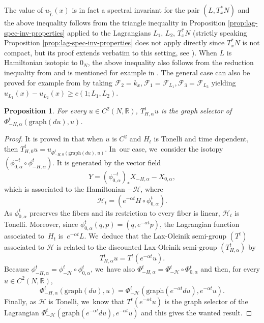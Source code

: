 \documentclass[JEP,XML,SOM,Unicode,NoFloatCountersInSection,published]{cedram}
\newtheorem{prop}[thm]{Proposition}
\theoremstyle{definition}
\newcommand{\Hh}{{\mathcal H}}
\newcommand{\R}{\mathbb{R}}
\begin{document}
The value of $u_{\tilde{L}}(x)$ is in fact a spectral invariant for the pair $(L,T_x^*N)$ and the above inequality follows from the triangle inequality in Proposition \ref{prop:lag-spec-inv-properties} applied to the Lagrangians $L_1$, $L_2$, $T_x^*N$ (strictly speaking Proposition \ref{prop:lag-spec-inv-properties} does not apply directly since $T_x^*N$ is not compact, but its proof extends verbatim to this setting, see \cite[Th.\,16]{Hum-Lec-Sey3}).
When $L$ is Hamiltonian isotopic to $0_N$, the above inequality also follows from the reduction inequality from \cite{Viterbo-STAGGF} and is mentioned for example in \cite[p.\,263]{Cardin-Viterbo}. The general case can also be proved for example from \cite[Prop.\,8.13]{Vichery-these} by taking
$\mathcal F_2=k_x, {\mathcal F}_1=\mathcal F_{L_1}, {\mathcal F}_3={\mathcal F}_{L_3}$ yielding $u_{L_1}(x)-u_{L_2}(x)\geq c(1;L_1,L_2)$.

\begin{prop}
For every $u\in C^2(N, \R)$, $T_{H, \alpha}^tu$ is the graph selector of $\Phi_{-H, \alpha}^t(\text{graph}(du), u)$.
\end{prop}
\begin{proof}
It is proved in \cite{Roos2019} that when $u$ is $C^2$ and $H_t$ is Tonelli and time dependent, then $T^t_{H, 0}u\!=\!u_{\Phi^t_{-H, 0}(\text{graph}(du), u)}$. In~our case, we~consider the isotopy~\hbox{$(\phi^{-t}_{0, \alpha}\circ \phi_{-H, \alpha}^{t})$}. It is generated by the vector field\vspace*{-3pt}
\[
Y=(\phi_{0,\alpha}^{-t})_* X_{-H,\alpha}-X_{0,\alpha},
\]
which is associated to the Hamiltonian $-\Hh$, where\vspace*{-3pt}
\[
\Hh_t=(e^{-\alpha t}H\circ \phi_{0, \alpha}^{t}).
\]
As $\phi_{0, \alpha}^{t}$ preserves the fibers and its restriction to every fiber is linear, $\Hh_t$ is Tonelli. Moreover, since $\phi_{0,\alpha}^t(q,p)=(q,e^{-\alpha t}p)$, the Lagrangian function associated to~$H_t$ is~$e^{-\alpha t}L$. We~deduce that the Lax-Oleinik semi-group $(T^t)$ associated to $\Hh$ is related to the discounted Lax-Oleinik semi-group $(T^t_{H, \alpha})$ by\vspace*{-3pt}
\[
T_{H, \alpha}^tu=T^t(e^{-\alpha t}u).
\]
Because $\phi_{-H, \alpha}^t =\phi^t_{-\Hh}\circ \phi_{0, \alpha}^t$, we~have also $\Phi_{-H, \alpha}^t =\Phi^t_{-\Hh}\circ \Phi_{0, \alpha}^t$ and then, for every $u\in C^2(N, \R)$,\vspace*{-3pt}
\[
\Phi_{-H, \alpha}^t(\text{graph}(du), u)=\Phi_{-\Hh}^t(\text{graph}(e^{-\alpha t}du), e^{-\alpha t}u).
\]
Finally, as $\Hh$ is Tonelli, we~know that $T^t(e^{-\alpha t}u)$ is the graph selector of the Lagrangian $\Phi_{-\Hh}^t(\text{graph}(e^{-\alpha t}du), e^{-\alpha t}u)$ and this gives the wanted result.
\end{proof}
\end{document}
